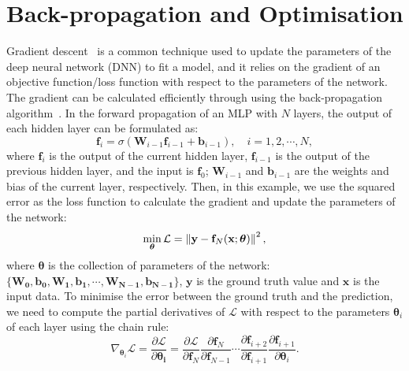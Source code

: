 \section{Back-propagation and Optimisation}
\label{ch3:bp}
Gradient descent~\cite{bottou2010large} is a common technique used to update the parameters of the deep neural network (DNN) to fit a model, and it relies on the gradient of an objective function/loss function with respect to the parameters of the network. The gradient can be calculated efficiently through using the back-propagation algorithm~\cite{kelley1960gradient}. In the forward propagation of an MLP with $N$ layers, the output of each hidden layer can be formulated as:
\begin{equation}
    \mathbf{f}_{i} = \sigma(\mathbf{W}_{i-1}\mathbf{f}_{i-1} + \mathbf{b}_{i-1}), \quad i = 1, 2, \cdots, N,
\end{equation}
where $\mathbf{f}_{i}$ is the output of the current hidden layer, $\mathbf{f}_{i-1}$ is the output of the previous hidden layer, and the input is $\mathbf{f}_{0}$; $\mathbf{W}_{i-1}$ and $\mathbf{b}_{i-1}$ are the weights and bias of the current layer, respectively. Then, in this example, we use the squared error as the loss function to calculate the gradient and update the parameters of the network:
\begin{equation}
    \min_{\bm{\theta}}\mathcal{L} = \left\lVert\mathbf{y} - \mathbf{f}_{N}(\mathbf{x};\bm{\theta})\right\rVert^{2},
\end{equation}
where $\bm{\theta}$ is the collection of parameters of the network: $\{\mathbf{W_{0}}, \mathbf{b_{0}}, \mathbf{W_{1}}, \mathbf{b_{1}}, \cdots, \mathbf{W_{N-1}}, \mathbf{b_{N-1}}\}$, $\mathbf{y}$ is the ground truth value and $\mathbf{x}$ is the input data. To minimise the error between the ground truth and the prediction, we need to compute the partial derivatives of $\mathcal{L}$ with respect to the parameters $\bm{\theta}_{i}$ of each layer using the chain rule:
\begin{equation}
   \nabla_{\bm{\theta}_{i}}\mathcal{L} = \frac{\partial \mathcal{L}}{\partial \bm{\theta_{i}}} = \frac{\partial \mathcal{L}}{\partial \mathbf{f}_{N}} \frac{\partial\mathbf{f}_{N}}{\partial \mathbf{f}_{N-1}}\cdots \frac{\partial\mathbf{f}_{i+2}}{\partial \mathbf{f}_{i+1}} \frac{\partial\mathbf{f}_{i+1}}{\partial \bm{\theta}_{i}}.
\end{equation}

